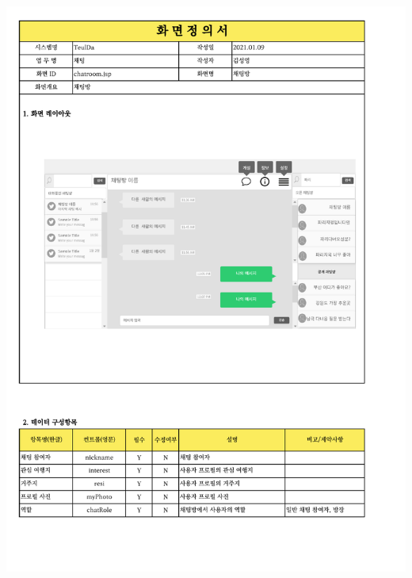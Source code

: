 {{{{{{{{{{{{{{{{{{{{{{{{{{{{{{{{{{{{{{{{{{{{{{{{{{{{{{{{{{{{{{\includegraphics[width=20cm]{./Figure/Analysis/Display/chat/chat_01.pdf} \\
}}}}}}}}}}}}}}}}}}}}}}}}}}}}}}}}}}}}}}}}}}}}}}}}}}}}}}}}}}}}}}
